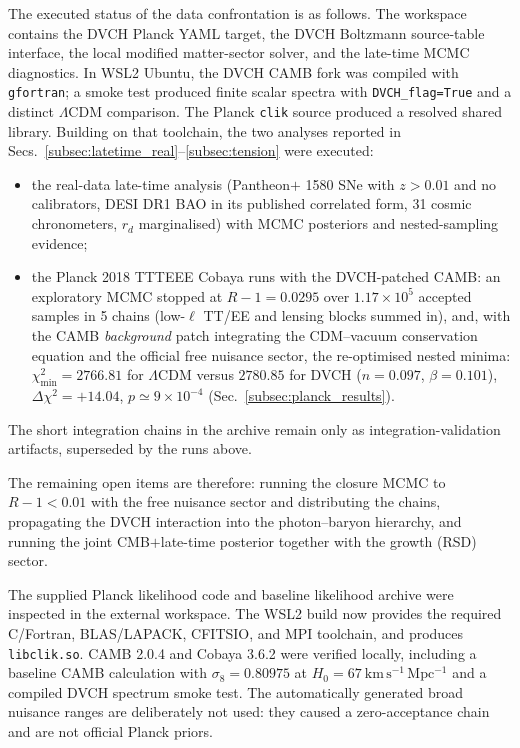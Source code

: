 \documentclass[pdflatex,sn-mathphys-num]{sn-jnl}%
\begin{document}
The executed status of the data confrontation is as follows. The workspace
contains the DVCH Planck YAML target, the DVCH Boltzmann source-table
interface, the local modified matter-sector solver, and the late-time MCMC
diagnostics. In WSL2 Ubuntu, the DVCH CAMB fork was compiled with
\texttt{gfortran}; a smoke test produced finite scalar spectra with
\texttt{DVCH\_flag=True} and a distinct $\Lambda$CDM comparison. The Planck
\texttt{clik} source produced a resolved shared library. Building on that
toolchain, the two analyses reported in
Secs.~\ref{subsec:latetime_real}--\ref{subsec:tension} were executed:
\begin{itemize}
    \item the real-data late-time analysis (Pantheon$+$ 1580 SNe with
    $z>0.01$ and no calibrators, DESI DR1 BAO in its published correlated
    form, 31 cosmic chronometers, $r_d$ marginalised) with MCMC
    posteriors and nested-sampling evidence;
    \item the Planck 2018 TTTEEE Cobaya runs with the DVCH-patched CAMB:
    an exploratory MCMC stopped at $R-1=0.0295$ over $1.17\times10^5$
    accepted samples in 5 chains (low-$\ell$ TT/EE and lensing blocks
    summed in), and, with the CAMB \emph{background} patch integrating
    the CDM--vacuum conservation equation and the official free nuisance
    sector, the re-optimised nested minima: $\chi^2_{\min}=2766.81$ for
    $\Lambda$CDM versus $2780.85$ for DVCH ($n=0.097$, $\beta=0.101$),
    $\Delta\chi^2=+14.04$, $p\simeq9\times10^{-4}$
    (Sec.~\ref{subsec:planck_results}).
\end{itemize}
The short integration chains in the archive remain only as
integration-validation artifacts, superseded by the runs above.

The remaining open items are therefore: running the closure MCMC to
$R-1<0.01$ with the free nuisance sector and distributing
the chains, propagating the DVCH
interaction into the photon--baryon hierarchy, and
running the joint CMB$+$late-time posterior together with the growth (RSD)
sector.

The supplied Planck likelihood code and baseline likelihood archive were
inspected in the external workspace. The WSL2 build now provides the required
C/Fortran, BLAS/LAPACK, CFITSIO, and MPI toolchain, and produces
\texttt{libclik.so}. CAMB 2.0.4 and Cobaya 3.6.2 were verified locally,
including a baseline CAMB calculation with
$\sigma_8=0.80975$ at $H_0=67~\mathrm{km\,s^{-1}\,Mpc^{-1}}$ and a compiled
DVCH spectrum smoke test. The automatically generated broad nuisance ranges are deliberately not used:
they caused a zero-acceptance chain and are not official Planck priors.
\end{document}
